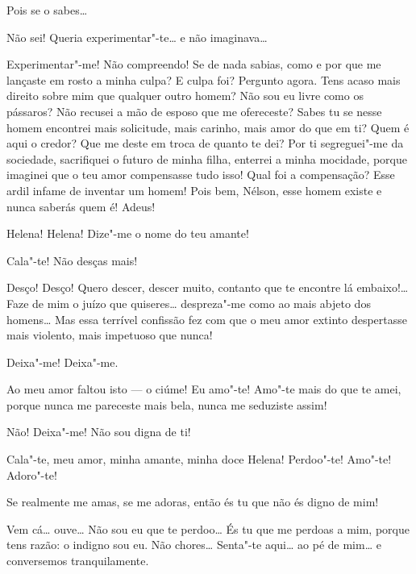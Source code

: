 {   Pois se o sabes\ldots{}

   Não sei! Queria
experimentar"-te\ldots{} e não imaginava\ldots{}

   Experimentar"-me! Não
compreendo! Se de nada sabias, como e por que me lançaste em rosto a
minha culpa? E culpa foi? Pergunto agora. Tens acaso mais direito sobre
mim que qualquer outro homem? Não sou eu livre como os pássaros? Não
recusei a mão de esposo que me ofereceste? Sabes tu se nesse homem
encontrei mais solicitude, mais carinho, mais amor do que em ti? Quem é
aqui o credor? Que me deste em troca de quanto te dei? Por ti
segreguei"-me da sociedade, sacrifiquei o futuro de minha filha,
enterrei a minha mocidade, porque imaginei que o teu amor compensasse
tudo isso! Qual foi a compensação? Esse ardil infame de inventar um
homem! Pois bem, Nélson, esse homem existe e nunca saberás quem é!
Adeus!

  Helena!
Helena! Dize"-me o nome do teu amante!

  Cala"-te! Não desças mais!

 
Desço! Desço! Quero descer, descer muito, contanto que te
encontre lá embaixo!\ldots{} Faze de mim o juízo que quiseres\ldots{} despreza"-me
como ao mais abjeto dos homens\ldots{} Mas essa terrível confissão fez com
que o meu amor extinto despertasse mais violento, mais impetuoso que
nunca!

  Deixa"-me! Deixa"-me.

  Ao meu amor faltou isto --- o ciúme! Eu amo"-te!
Amo"-te mais do que te amei, porque nunca me pareceste mais bela, nunca
me seduziste assim!

  Não! Deixa"-me! Não sou digna de ti!

  Cala"-te, meu amor, minha amante, minha doce
Helena! Perdoo"-te! Amo"-te! Adoro"-te!

  Se realmente me amas, se me adoras, então és
tu que não és digno de mim! 

   Vem cá\ldots{} 
ouve\ldots{} Não sou eu que te perdoo\ldots{} És tu que me perdoas a mim, porque
tens razão: o indigno sou eu.  Não
chores\ldots{} Senta"-te aqui\ldots{} ao pé de mim\ldots{} e conversemos
tranquilamente. 

}

